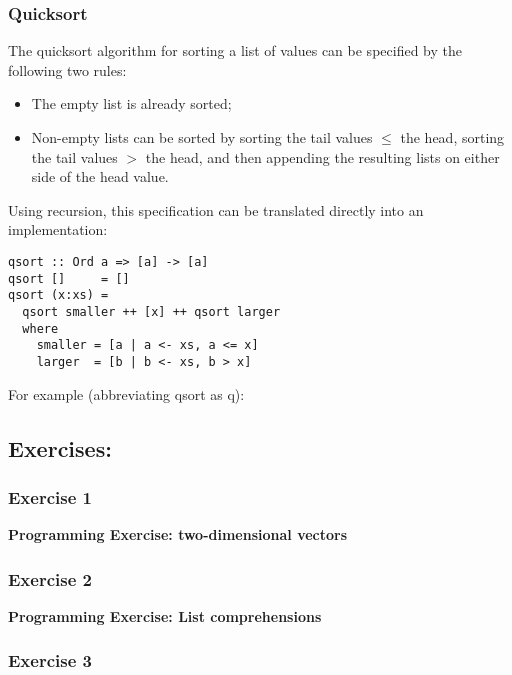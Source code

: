 \begin{multicols}{2}
\subsubsection{Quicksort}
The quicksort algorithm for sorting a list of values can be specified by the following two rules:
\begin{itemize}
  \item The empty list is already sorted;
  \item Non-empty lists can be sorted by sorting the tail values $\leq$ the head, sorting the tail values $>$ the head, and then appending the resulting lists on either side of the head value.
\end{itemize}

Using recursion, this specification can be translated directly into an implementation:
\begin{lstlisting}
qsort :: Ord a => [a] -> [a]
qsort []     = []
qsort (x:xs) =
  qsort smaller ++ [x] ++ qsort larger
  where
    smaller = [a | a <- xs, a <= x]
    larger  = [b | b <- xs, b > x]
\end{lstlisting}

For example (abbreviating qsort as q):


\subsection{Exercises:}

\subsubsection{Exercise 1}

\end{multicols}
\textbf{Programming Exercise: two-dimensional vectors}\\

\newpage
\begin{multicols}{2}

\subsubsection{Exercise 2}

\end{multicols}
\textbf{Programming Exercise: List comprehensions}\\

\newpage
\begin{multicols}{2}

\subsubsection{Exercise 3}

\end{multicols}
